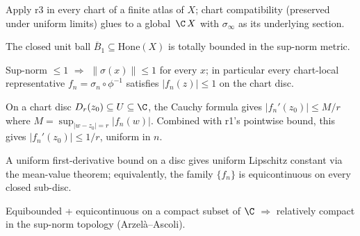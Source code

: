 \begin{lemma}
\label{lem:r8subB-B-r4}
Apply r3 in every chart of a finite atlas of \(X\); chart
compatibility (preserved under uniform limits) glues to a global
\(\,\C\,X\) with \(\sigma_{\infty}\) as
its underlying section.
\leanok
\end{lemma}

\begin{lemma}
\label{lem:r8subB-totally-bounded}
The closed unit ball
\(\overline{B}_{1}\subseteq\mathrm{Hone}(X)\) is totally bounded
in the sup-norm metric.
\leanok
\end{lemma}

\begin{lemma}
\label{lem:r8subB-C-r1}
Sup-norm \(\leq 1\) \(\Rightarrow\) \(\|\sigma(x)\|\leq 1\) for every \(x\); in
particular every chart-local representative \(f_{n}=\sigma_{n}\circ\phi^{-1}\)
satisfies \(|f_{n}(z)|\leq 1\) on the chart disc.
\leanok
\end{lemma}

\begin{lemma}
\label{lem:r8subB-C-r2}
On a chart disc \(D_{r}(z_{0})\subseteq U\subseteq\C\), the
Cauchy formula gives \(|f_{n}'(z_{0})|\leq M/r\) where
\(M=\sup_{|w-z_{0}|=r}|f_{n}(w)|\).  Combined with r1's pointwise
bound, this gives \(|f_{n}'(z_{0})|\leq 1/r\), uniform in \(n\).
\leanok
\end{lemma}

\begin{lemma}
\label{lem:r8subB-C-r3}
A uniform first-derivative bound on a disc gives uniform Lipschitz
constant via the mean-value theorem; equivalently, the family
\(\{f_{n}\}\) is equicontinuous on every closed sub-disc.
\leanok
\end{lemma}

\begin{lemma}
\label{lem:r8subB-C-r4}
Equibounded + equicontinuous on a compact subset of \(\C\) \(\Rightarrow\)
relatively compact in the sup-norm topology (Arzel\`a--Ascoli).
\leanok
\end{lemma}

